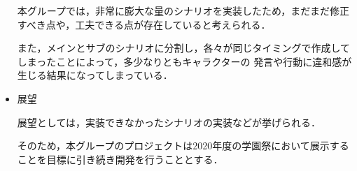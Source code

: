 \begin{itemize}

        本グループでは，非常に膨大な量のシナリオを実装したため，まだまだ修正すべき点や，工夫できる点が存在していると考えられる．

        また，メインとサブのシナリオに分割し，各々が同じタイミングで作成してしまったことによって，多少なりともキャラクターの
        発言や行動に違和感が生じる結果になってしまっている．

        \item 展望
        

        展望としては，実装できなかったシナリオの実装などが挙げられる．

        そのため，本グループのプロジェクトは2020年度の学園祭において展示することを目標に引き続き開発を行うこととする．

    \end{itemize}

